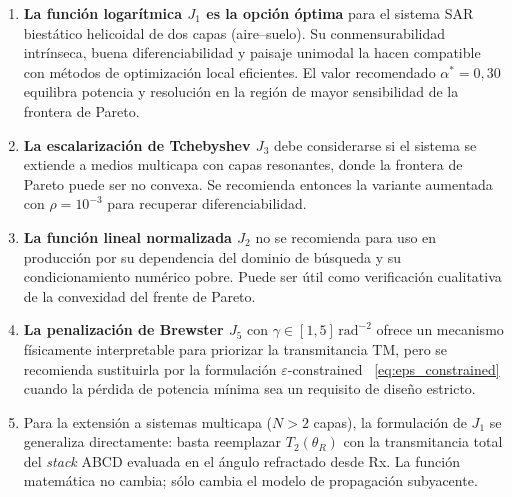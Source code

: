 \documentclass[11pt, a4paper]{article}
\begin{document}
\begin{enumerate}
  \item \textbf{La función logarítmica $J_1$ es la opción óptima} para el sistema SAR
    biestático helicoidal de dos capas (aire–suelo). Su conmensurabilidad intrínseca,
    buena diferenciabilidad y paisaje unimodal la hacen compatible con métodos de
    optimización local eficientes. El valor recomendado $\alpha^* = 0{,}30$ equilibra
    potencia y resolución en la región de mayor sensibilidad de la frontera de Pareto.

  \item \textbf{La escalarización de Tchebyshev $J_3$} debe considerarse si el sistema
    se extiende a medios multicapa con capas resonantes, donde la frontera de Pareto
    puede ser no convexa. Se recomienda entonces la variante aumentada con
    $\rho = 10^{-3}$ para recuperar diferenciabilidad.

  \item \textbf{La función lineal normalizada $J_2$} no se recomienda para uso en
    producción por su dependencia del dominio de búsqueda y su condicionamiento
    numérico pobre. Puede ser útil como verificación cualitativa de la convexidad del
    frente de Pareto.

  \item \textbf{La penalización de Brewster $J_5$} con $\gamma \in [1,5]\,\mathrm{rad}^{-2}$
    ofrece un mecanismo físicamente interpretable para priorizar la transmitancia TM,
    pero se recomienda sustituirla por la formulación $\varepsilon$-constrained~%
    \eqref{eq:eps_constrained} cuando la pérdida de potencia mínima sea un requisito
    de diseño estricto.

  \item Para la extensión a sistemas multicapa ($N > 2$ capas), la formulación de $J_1$
    se generaliza directamente: basta reemplazar $T_2(\theta_R)$ con la transmitancia
    total del \emph{stack} ABCD evaluada en el ángulo refractado desde Rx. La función
    matemática no cambia; sólo cambia el modelo de propagación subyacente.
\end{enumerate}
\end{document}
